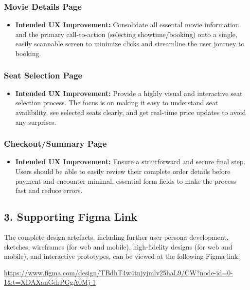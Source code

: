 \documentclass[12pt,a4paper]{article}
\begin{document}
\subsubsection*{Movie Details Page}
\begin{itemize}
    \item \textbf{Intended UX Improvement:} Consolidate all essental movie information and the primary call-to-action (selecting showtime/booking) onto a single, easily scannable screen to minimize clicks and streamline the user journey to booking.
\end{itemize}

\subsubsection*{Seat Selection Page}
\begin{itemize}
    \item \textbf{Intended UX Improvement:} Provide a highly visual and interactive seat selection process. The focus is on making it easy to understand seat availibility, see selected seats clearly, and get real-time price updates to avoid any surprises.
\end{itemize}

\subsubsection*{Checkout/Summary Page}
\begin{itemize}
    \item \textbf{Intended UX Improvement:} Ensure a straitforward and secure final step. Users should be able to easily review their complete order details before payment and encounter minimal, essential form fields to make the process fast and reduce errors.
\end{itemize}

\subsection*{3. Supporting Figma Link}
The complete design artefacts, including further user persona development, sketches, wireframes (for web and mobile), high-fidelity designs (for web and mobile), and interactive prototypes, can be viewed at the following Figma link:

\url{https://www.figma.com/design/TBdhT4w4tnjyjmlv25haL9/CW?node-id=0-1&t=XDAXanGdrPGgA0Mj-1}

\vspace{1cm}
\end{document}
